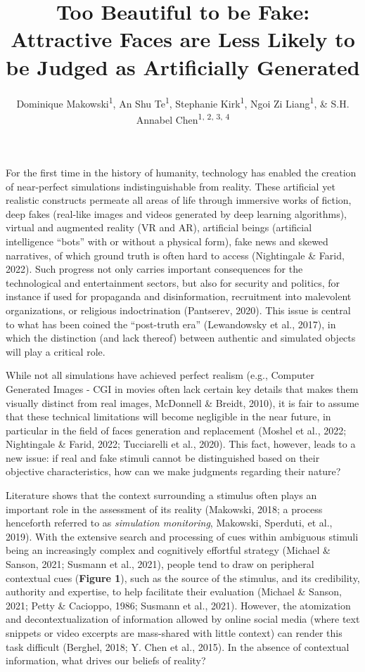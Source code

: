 \documentclass[
  man,floatsintext]{apa6}
\title{\textbf{Too Beautiful to be Fake: Attractive Faces are Less Likely to be Judged as Artificially Generated}}
\author{Dominique Makowski\textsuperscript{1}, An Shu Te\textsuperscript{1}, Stephanie Kirk\textsuperscript{1}, Ngoi Zi Liang\textsuperscript{1}, \& S.H. Annabel Chen\textsuperscript{1, 2, 3, 4}}
\date{}
\affiliation{\vspace{0.5cm}\textsuperscript{1} School of Social Sciences, Nanyang Technological University, Singapore\\\textsuperscript{2} LKC Medicine, Nanyang Technological University, Singapore\\\textsuperscript{3} National Institute of Education, Singapore\\\textsuperscript{4} Centre for Research and Development in Learning, Nanyang Technological University, Singapore}
\begin{document}
\maketitle

For the first time in the history of humanity, technology has enabled the creation of near-perfect simulations indistinguishable from reality. These artificial yet realistic constructs permeate all areas of life through immersive works of fiction, deep fakes (real-like images and videos generated by deep learning algorithms), virtual and augmented reality (VR and AR), artificial beings (artificial intelligence ``bots'' with or without a physical form), fake news and skewed narratives, of which ground truth is often hard to access (Nightingale \& Farid, 2022). Such progress not only carries important consequences for the technological and entertainment sectors, but also for security and politics, for instance if used for propaganda and disinformation, recruitment into malevolent organizations, or religious indoctrination (Pantserev, 2020). This issue is central to what has been coined the ``post-truth era'' (Lewandowsky et al., 2017), in which the distinction (and lack thereof) between authentic and simulated objects will play a critical role.

While not all simulations have achieved perfect realism (e.g., Computer Generated Images - CGI in movies often lack certain key details that makes them visually distinct from real images, McDonnell \& Breidt, 2010), it is fair to assume that these technical limitations will become negligible in the near future, in particular in the field of faces generation and replacement (Moshel et al., 2022; Nightingale \& Farid, 2022; Tucciarelli et al., 2020). This fact, however, leads to a new issue: if real and fake stimuli cannot be distinguished based on their objective characteristics, how can we make judgments regarding their nature?

Literature shows that the context surrounding a stimulus often plays an important role in the assessment of its reality (Makowski, 2018; a process henceforth referred to as \emph{simulation monitoring}, Makowski, Sperduti, et al., 2019). With the extensive search and processing of cues within ambiguous stimuli being an increasingly complex and cognitively effortful strategy (Michael \& Sanson, 2021; Susmann et al., 2021), people tend to draw on peripheral contextual cues (\textbf{Figure 1}), such as the source of the stimulus, and its credibility, authority and expertise, to help facilitate their evaluation (Michael \& Sanson, 2021; Petty \& Cacioppo, 1986; Susmann et al., 2021). However, the atomization and decontextualization of information allowed by online social media (where text snippets or video excerpts are mass-shared with little context) can render this task difficult (Berghel, 2018; Y. Chen et al., 2015). In the absence of contextual information, what drives our beliefs of reality?
\end{document}
